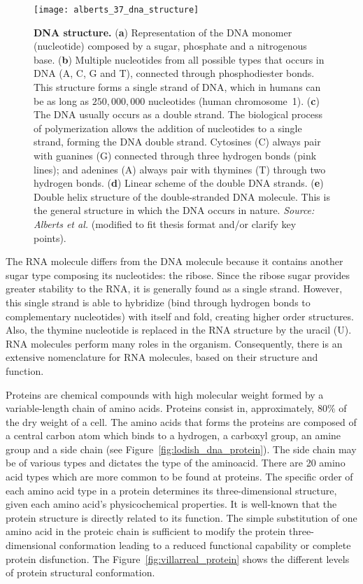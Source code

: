 \begin{figure}[h!]
\centering
\texttt{[image: alberts\_37\_dna\_structure]}
\caption[DNA structure]{\textbf{DNA structure.} (\textbf{a}) Representation of the DNA monomer (nucleotide) composed by a sugar, phosphate and a nitrogenous base. (\textbf{b}) Multiple nucleotides from all possible types that occurs in DNA (A, C, G and T), connected through phosphodiester bonds. This structure forms a single strand of DNA, which  in humans can be as long as \approxy$250,000,000$ nucleotides (human chromosome~1). (\textbf{c}) The DNA usually occurs as a double strand. The biological process of polymerization allows the addition of nucleotides to a single strand, forming the DNA double strand. Cytosines (C) always pair with guanines (G) connected through three hydrogen bonds (pink lines); and adenines (A) always pair with thymines (T) through two hydrogen bonds. (\textbf{d}) Linear scheme of the double DNA strands. (\textbf{e}) Double helix structure of the double-stranded DNA molecule. This is the general structure in which the DNA occurs in nature. \emph{Source: Alberts et al.}\cite{alberts2007} (modified to fit thesis format and/or clarify key points).}
\label{fig:alberts_dna_structure}
\end{figure}

The RNA molecule differs from the DNA molecule because it contains another sugar type composing its nucleotides: the ribose. Since the ribose sugar provides greater stability to the RNA, it is generally found as a single strand. However, this single strand is able to hybridize (bind through hydrogen bonds to complementary nucleotides) with itself and fold, creating higher order structures. Also, the thymine nucleotide is replaced in the RNA structure by the uracil (U). RNA molecules perform many roles in the organism. Consequently, there is an extensive nomenclature for RNA molecules, based on their structure and function.

Proteins are chemical compounds with high molecular weight formed by a variable-length chain of amino acids. Proteins consist in, approximately, $80\%$ of the dry weight of a cell. The amino acids that forms the proteins are composed of a central carbon atom which binds to a hydrogen, a carboxyl group, an amine group and a side chain (see Figure~\ref{fig:lodish_dna_protein}). The side chain may be of various types and dictates the type of the aminoacid. There are 20 amino acid types which are more common to be found at proteins. The specific order of each amino acid type in a protein determines its three-dimensional structure, given each amino acid's physicochemical properties. It is well-known that the protein structure is directly related to its function. The simple substitution of one amino acid in the proteic chain is sufficient to modify the protein three-dimensional conformation leading to a reduced functional capability or complete protein disfunction. The Figure~\ref{fig:villarreal_protein} shows the different levels of protein structural conformation.

